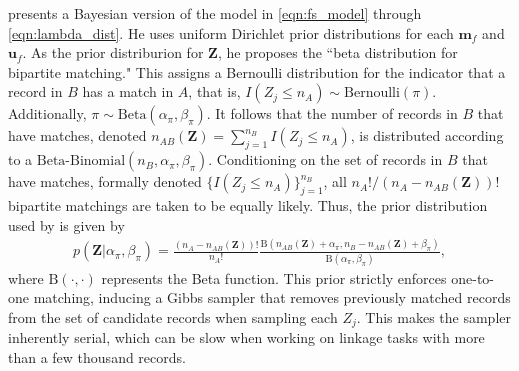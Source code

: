 \documentclass[ba]{imsart}
\begin{document}



\cite{sadinle_bayesian_2017} presents a Bayesian version of the model in \eqref{eqn:fs_model} through \eqref{eqn:lambda_dist}.  He uses uniform Dirichlet prior distributions for each $\bm{m}_f$ and $\bm{u}_f$.  As the prior distriburion for  $\bm{Z}$, he proposes the ``beta distribution for bipartite matching."  This assigns a Bernoulli distribution for the indicator that a record in $B$ has a match in $A$, that is, $I(Z_j \leq n_A) \sim \text{Bernoulli}(\pi)$.  Additionally, $\pi \sim \text{Beta}(\alpha_{\pi}, \beta_{\pi})$. It follows that the number of records in $B$ that have matches, denoted $n_{AB}(\bm{Z}) = \sum_{j=1}^{n_B} I(Z_j \leq n_A)$, is distributed according to a $\text{Beta-Binomial}(n_B, \alpha_{\pi}, \beta_{\pi})$. Conditioning on the set of records in $B$ that have matches, formally denoted $\{I(Z_j \leq n_A)\}_{j=1}^{n_B}$, all $n_A ! / (n_A - n_{AB}(\bm{Z}))!$ bipartite matchings are taken to be equally likely. Thus, the prior distribution used by \cite{sadinle_bayesian_2017} is given by
\begin{align}
\label{eqn:sadinle_prior}
p(\bm{Z}|\alpha_{\pi}, \beta_{\pi}) = \frac{(n_A - n_{AB}(\bm{Z}))!}{n_A !}\frac{\text{B}(n_{AB}(\bm{Z}) + \alpha_{\pi}, n_B - n_{AB}(\bm{Z}) + \beta_{\pi})}{\text{B}(\alpha_{\pi}, \beta_{\pi})},
\end{align}
where $\text{B}(\cdot, \cdot)$ represents the Beta function. This prior strictly enforces one-to-one matching, inducing a Gibbs sampler that removes previously matched records from the set of candidate records when sampling each $Z_j$. This makes the sampler inherently serial, which can be slow when working on linkage tasks with more than a few thousand records.
\end{document}
